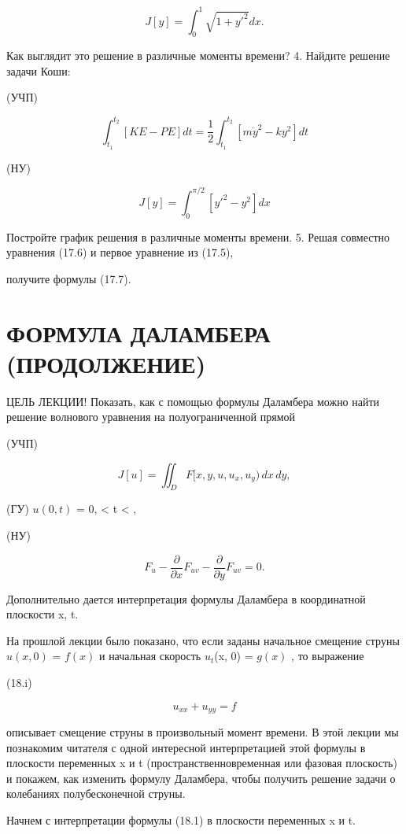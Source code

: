 \documentclass[
  ukrainian,
]{article}
\begin{document}
\[
J[y] = \int_{0}^{1} \sqrt{1 + y'^{2}} dx.
\]

Как выглядит это решение в различные моменты времени? 4. Найдите решение
задачи Коши:

(УЧП)

\[
\int_{t_{1}}^{t_{2}} [KE - PE] dt = \frac{1}{2} \int_{t_{1}}^{t_{2}} [m\dot{y}^{2} - ky^{2}] dt
\]

(НУ)

\[
J[y] = \int_{0}^{\pi/2} [y'^{2} - y^{2}] dx
\]

Постройте график решения в различные моменты времени. 5. Решая совместно
уравнения (17.6) и первое уравнение из (17.5),

получите формулы (17.7).

\section{ФОРМУЛА ДАЛАМБЕРА
(ПРОДОЛЖЕНИЕ)}\label{ux444ux43eux440ux43cux443ux43bux430-ux434ux430ux43bux430ux43cux431ux435ux440ux430-ux43fux440ux43eux434ux43eux43bux436ux435ux43dux438ux435}

ЦЕЛЬ ЛЕКЦИИ! Показать, как с помощью формулы Даламбера можно найти
решение волнового уравнения на полуограниченной прямой

(УЧП)

\[
J[u] = \iint_D F[x, y, u, u_x, u_y) \, dx \, dy,
\]

(ГУ) \(u(0, t)\) = 0,  \textless{} t \textless{} \infty,

(НУ)

\[
F_{u} - \frac{\partial}{\partial x} F_{uv} - \frac{\partial}{\partial y} F_{uv} = 0.
\]

Дополнительно дается интерпретация формулы Даламбера в координатной
плоскости x, t.

На прошлой лекции было показано, что если заданы начальное смещение
струны \(u(x, 0)\) = \(f(x)\) и начальная скорость \(u_t\)(x, 0) =
\(g(x)\) , то выражение

(18.i)

\[
u_{xx} + u_{yy} = f
\]

описывает смещение струны в произвольный момент времени. В этой лекции
мы познакомим читателя с одной интересной интерпретацией этой формулы в
плоскости переменных x и t (пространственновременная или фазовая
плоскость) и покажем, как изменить формулу Даламбера, чтобы получить
решение задачи о колебаниях полубесконечной струны.

Начнем с интерпретации формулы (18.1) в плоскости переменных x и t.
\end{document}
